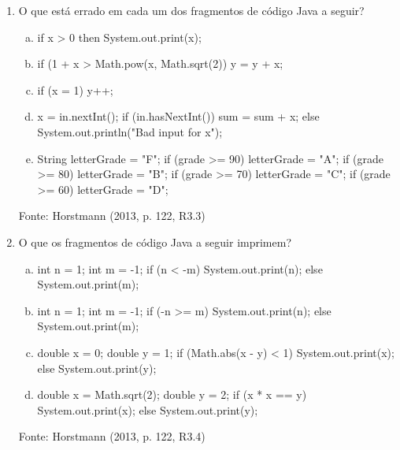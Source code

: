 \documentclass[onecolumn,a4paper,10pt]{report}
\newcommand{\+}{\, + \,}
\newcommand{\<}{\hspace*{-0.4cm}}
\begin{document}
\begin{enumerate}[1.]
\item O que está errado em cada um dos fragmentos de código Java a seguir?
\begin{enumerate}[a)]
\item
\begin{javacode}
if x > 0 then System.out.print(x);
\end{javacode}
\item
\begin{javacode}
if (1 + x > Math.pow(x, Math.sqrt(2)) { y = y + x; }
\end{javacode}
\item
\begin{javacode}
if (x = 1) { y++; }
\end{javacode}
\item
\begin{javacode}
x = in.nextInt();
if (in.hasNextInt()) {
   sum = sum + x;
}
else {
   System.out.println("Bad input for x");
}
\end{javacode}
\item
\begin{javacode}
String letterGrade = "F";
if (grade >= 90) { letterGrade = "A"; }
if (grade >= 80) { letterGrade = "B"; }
if (grade >= 70) { letterGrade = "C"; }
if (grade >= 60) { letterGrade = "D"; }
\end{javacode}
\end{enumerate}
{\tiny Fonte: Horstmann (2013, p. 122, R3.3)}

\item O que os fragmentos de código Java a seguir imprimem?
\begin{enumerate}[a)]
\item
\begin{javacode}
int n = 1;
int m = -1;
if (n < -m) { System.out.print(n); }
else { System.out.print(m); }
\end{javacode}
\item
\begin{javacode}
int n = 1;
int m = -1;
if (-n >= m) { System.out.print(n); }
else { System.out.print(m); }
\end{javacode}
\item
\begin{javacode}
double x = 0;
double y = 1;
if (Math.abs(x - y) < 1) { System.out.print(x); }
else { System.out.print(y); }
\end{javacode}
\item
\begin{javacode}
double x = Math.sqrt(2);
double y = 2;
if (x * x == y) { System.out.print(x); }
else { System.out.print(y); }
\end{javacode}
\end{enumerate}
{\tiny Fonte: Horstmann (2013, p. 122, R3.4)}


\end{enumerate}
\end{document}

